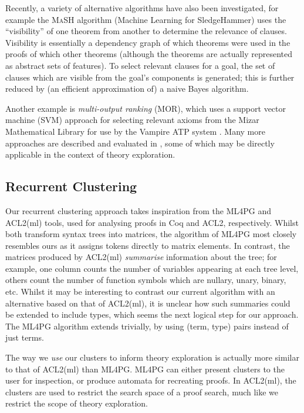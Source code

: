 Recently, a variety of alternative algorithms have also been investigated, for example the \textsc{MaSH} algorithm (Machine Learning for SledgeHammer) \citep{kuhlwein2013mash} uses the ``visibility'' of one theorem from another to determine the relevance of clauses. Visibility is essentially a dependency graph of which theorems were used in the proofs of which other theorems (although the theorems are actually represented as abstract sets of features). To select relevant clauses for a goal, the set of clauses which are visible from the goal's components is generated; this is further reduced by (an efficient approximation of) a naive Bayes algorithm.

Another example is \emph{multi-output ranking} (MOR), which uses a support vector machine (SVM) approach for selecting relevant axioms from the Mizar Mathematical Library for use by the Vampire ATP system \citep{alama2014premise}. Many more approaches are described and evaluated in \citep{kuhlwein2012overview}, some of which may be directly applicable in the context of theory exploration.

\subsection{Recurrent Clustering}
\label{sec:clusteringexpressions}

Our recurrent clustering approach takes inspiration from the ML4PG \citep{journals/corr/abs-1212-3618} and ACL2(ml) \citep{heras2013proof} tools, used for analysing proofs in Coq and ACL2, respectively. Whilst both transform syntax trees into matrices, the algorithm of ML4PG most closely resembles ours as it assigns tokens directly to matrix elements. In contrast, the matrices produced by ACL2(ml) \emph{summarise} information about the tree; for example, one column counts the number of variables appearing at each tree level, others count the number of function symbols which are nullary, unary, binary, etc. Whilst it may be interesting to contrast our current algorithm with an alternative based on that of ACL2(ml), it is unclear how such summaries could be extended to include types, which seems the next logical step for our approach. The ML4PG algorithm extends trivially, by using (term, type) pairs instead of just terms.

The way we \emph{use} our clusters to inform theory exploration is actually more similar to that of ACL2(ml) than ML4PG. ML4PG can either present clusters to the user for inspection, or produce automata for recreating proofs. In ACL2(ml), the clusters are used to restrict the search space of a proof search, much like we restrict the scope of theory exploration.

